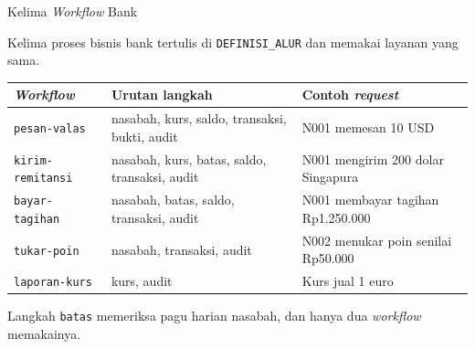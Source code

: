 \documentclass[aspectratio=169, table, 12pt]{beamer}
\begin{document}
\begin{frame}{{\Large Kelima \textit{Workflow} Bank}}
  \vspace{12pt}
  \raggedright
  {\small Kelima proses bisnis bank tertulis di \texttt{DEFINISI\_ALUR} dan
  memakai layanan yang sama.}

  \vspace{6pt}
  \centering
  \footnotesize
  \begin{tabularx}{\textwidth}{|l|p{5.5cm}|>{\raggedright\arraybackslash}X|}
    \hline
    \textbf{\textit{Workflow}} & \textbf{Urutan langkah} & \textbf{Contoh \textit{request}} \\
    \hline
    \texttt{pesan-valas} & nasabah, kurs, saldo, transaksi, bukti, audit & N001 memesan 10 USD \\
    \hline
    \texttt{kirim-remitansi} & nasabah, kurs, batas, saldo, transaksi, audit & N001 mengirim 200 dolar Singapura \\
    \hline
    \texttt{bayar-tagihan} & nasabah, batas, saldo, transaksi, audit & N001 membayar tagihan Rp1.250.000 \\
    \hline
    \texttt{tukar-poin} & nasabah, transaksi, audit & N002 menukar poin senilai Rp50.000 \\
    \hline
    \texttt{laporan-kurs} & kurs, audit & Kurs jual 1 euro \\
    \hline
  \end{tabularx}

  \vspace{6pt}
  \raggedright
  {\small Langkah \texttt{batas} memeriksa pagu harian nasabah, dan hanya dua
  \textit{workflow} memakainya.}
\end{frame}
\end{document}

